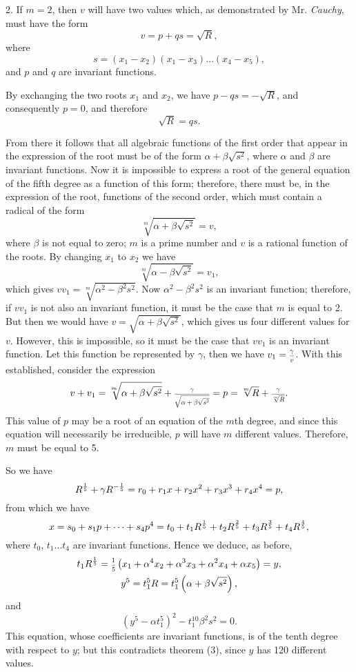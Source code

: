 \documentclass[oneside, 12 pt, leqno]{memoir}
\let\oldfrac\frac
\def\frac#1#2{\mathchoice{\text{\scalebox{.83}{${\oldfrac{#1}{#2}}$}}}{\text{\scalebox{.83}{${\displaystyle\oldfrac{#1}{#2}}$}}}{\genfrac{}{}{}{2}{#1}{#2}}{\genfrac{}{}{}{3}{#1}{#2}}}
\begin{document}
2. If \(m=2\), then \(v\) will have two values which, as demonstrated by Mr. \textit{Cauchy}, must have the form
\[v=p+qs=\sqrt{R},\]
where
\[s=\left(x_1-x_2\right)\left(x_1-x_3\right) \dots\left(x_4-x_5\right),\]
and \(p\) and \(q\) are invariant functions.

By exchanging the two roots \(x_1\) and \(x_2\), we have \(p-q s=-\sqrt{R}\), and consequently \(p=0\), and therefore
\[\sqrt{R}=q s.\]

From there it follows that all algebraic functions of the first order that appear in the expression of the root must be of the form \(\alpha+\beta \sqrt{s^2}\), where \(\alpha\) and \(\beta\) are invariant functions. Now it is impossible to express a root of the general equation of the fifth degree as a function of this form; therefore, there must be, in the expression of the root, functions of the second order, which must contain a radical of the form
\[\sqrt[m]{\alpha+\beta \sqrt{s^2}}=v,\]
where \(\beta\) is not equal to zero; \(m\) is a prime number and \(v\) is a rational function of the roots. By changing \(x_1\) to \(x_2\) we have
\[\sqrt[m]{\alpha-\beta \sqrt{s^2}} = v_1,\]
which gives \(v v_1 = \sqrt[m]{\alpha^2-\beta^2 s^2}\). Now \(\alpha^2-\beta^2 s^2\) is an invariant function; therefore, if \(v v_1\) is not also an invariant function, it must be the case that \(m\) is equal to 2. But then we would have \(v = \sqrt{\alpha+\beta \sqrt{s^2}}\), which gives us four different values for \(v\). However, this is impossible, so it must be the case that \(v v_1\) is an invariant function. Let this function be represented by \(\gamma\), then we have \(v_1 = \frac{\gamma}{v}\). With this established, consider the expression
\[v + v_1 = \sqrt[m]{\alpha+\beta \sqrt{s^2}} + \frac{\gamma}{\sqrt{\alpha+\beta \sqrt{s^2}}} = p = \sqrt[m]{R} + \frac{\gamma}{\sqrt[m]{R}}.\]
This value of \(p\) may be a root of an equation of the \(m\)th degree, and since this equation will necessarily be irreducible, \(p\) will have \(m\) different values. Therefore, \(m\) must be equal to 5.

So we have
\[R^{\frac{1}{5}}+\gamma R^{-\frac{1}{5}}=r_0+r_1 x+r_2 x^2+r_3 x^3+r_4 x^4=p,\]
from which we have
\[x=s_0+s_1 p+\dots+s_4 p^4=t_0+t_1 R^{\frac{1}{5}}+t_2 R^{\frac{2}{5}}+t_3 R^{\frac{3}{5}}+t_4 R^{\frac{4}{5}},\]
where \(t_0\), \(t_1 \dots t_4\) are invariant functions. Hence we deduce, as before,
\[\begin{gathered}
t_1 R^{\frac{1}{5}}=\frac{1}{5}\left(x_1+\alpha^4 x_2+\alpha^3 x_3+\alpha^2 x_4+\alpha x_5\right)=y, \\
y^5=t_1^5 R=t_1^5\left(\alpha+\beta \sqrt{s^2}\right),
\end{gathered}\]
and
\[\left(y^5-\alpha t_1^5\right)^2-t_1^{10} \beta^2 s^2=0.\]
This equation, whose coefficients are invariant functions, is of the tenth degree with respect to \(y\); but this contradicts theorem (3), since \(y\) has 120 different values.
\end{document}
